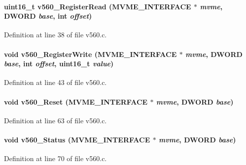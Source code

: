 \paragraph[{v560\_\-RegisterRead}]{\setlength{\rightskip}{0pt plus 5cm}uint16\_\-t v560\_\-RegisterRead ({\bf MVME\_\-INTERFACE} $\ast$ {\em mvme}, \/  {\bf DWORD} {\em base}, \/  int {\em offset})}\hfill\label{v560_8c_ad56bcbcf69a61c422e3a92b69e348376}


Definition at line 38 of file v560.c.
\paragraph[{v560\_\-RegisterWrite}]{\setlength{\rightskip}{0pt plus 5cm}void v560\_\-RegisterWrite ({\bf MVME\_\-INTERFACE} $\ast$ {\em mvme}, \/  {\bf DWORD} {\em base}, \/  int {\em offset}, \/  uint16\_\-t {\em value})}\hfill\label{v560_8c_ae16ee0157660e998432d1070839ffad1}


Definition at line 43 of file v560.c.
\paragraph[{v560\_\-Reset}]{\setlength{\rightskip}{0pt plus 5cm}void v560\_\-Reset ({\bf MVME\_\-INTERFACE} $\ast$ {\em mvme}, \/  {\bf DWORD} {\em base})}\hfill\label{v560_8c_a9299f3b2aa39f62abbe6deb487416029}


Definition at line 63 of file v560.c.
\paragraph[{v560\_\-Status}]{\setlength{\rightskip}{0pt plus 5cm}void v560\_\-Status ({\bf MVME\_\-INTERFACE} $\ast$ {\em mvme}, \/  {\bf DWORD} {\em base})}\hfill\label{v560_8c_ac2004e54348a75af094e45a37b9d4be4}


Definition at line 70 of file v560.c.